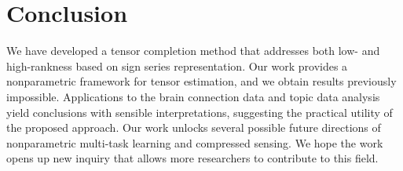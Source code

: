 \documentclass[useAMS,usenatbib,usegraphicx,referee]{biom}
\theoremstyle{plain}
\theoremstyle{definition}
\begin{document}
\section{Conclusion}
We have developed a tensor completion method that addresses both low- and high-rankness based on sign series representation. Our work provides a nonparametric framework for tensor estimation, and we obtain results  previously impossible. Applications to the brain connection data and topic data analysis yield conclusions with sensible interpretations, suggesting the practical utility of the proposed approach. Our work unlocks several possible future directions of nonparametric multi-task learning and compressed sensing. We hope the work opens up new inquiry that allows more researchers to contribute to this field.
\label{lastpage}

\newpage
\begingroup\footnotesize
\let\section\section
\makeatletter
\makeatother


\endgroup
\end{document}
